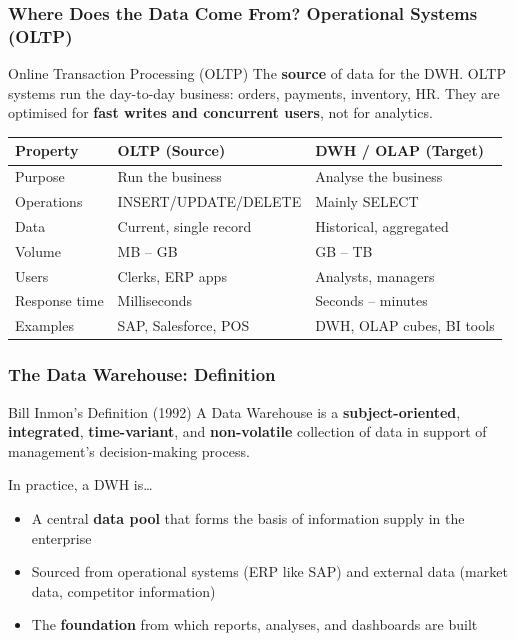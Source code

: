 \begin{frame}
  \frametitle{Where Does the Data Come From? Operational Systems (OLTP)}

  \begin{block}{Online Transaction Processing (OLTP)}
    The \textbf{source} of data for the DWH. OLTP systems run the day-to-day
    business: orders, payments, inventory, HR.
    They are optimised for \textbf{fast writes and concurrent users}, not for analytics.
  \end{block}

  \begin{tabularx}{\linewidth}{@{}l X X@{}}
    \toprule
    \textbf{Property}  & \textbf{OLTP (Source)}            & \textbf{DWH / OLAP (Target)} \\
    \midrule
    Purpose            & Run the business                  & Analyse the business \\
    Operations         & INSERT/UPDATE/DELETE              & Mainly SELECT \\
    Data               & Current, single record            & Historical, aggregated \\
    Volume             & MB -- GB                          & GB -- TB \\
    Users              & Clerks, ERP apps                  & Analysts, managers \\
    Response time      & Milliseconds                      & Seconds -- minutes \\
    Examples           & SAP, Salesforce, POS              & DWH, OLAP cubes, BI tools \\
    \bottomrule
  \end{tabularx}
\end{frame}


\begin{frame}
  \frametitle{The Data Warehouse: Definition}

  \begin{block}{Bill Inmon's Definition (1992)}
    A Data Warehouse is a \textbf{subject-oriented}, \textbf{integrated},
    \textbf{time-variant}, and \textbf{non-volatile} collection of data
    in support of management's decision-making process.
  \end{block}

  \vspace{0.5em}
  \begin{block}{In practice, a DWH is\ldots}
    \begin{itemize}
      \item A central \textbf{data pool} that forms the basis of information
        supply in the enterprise
      \item Sourced from operational systems (ERP like SAP) and external
        data (market data, competitor information)
      \item The \textbf{foundation} from which reports, analyses, and dashboards
        are built
    \end{itemize}
  \end{block}
\end{frame}

